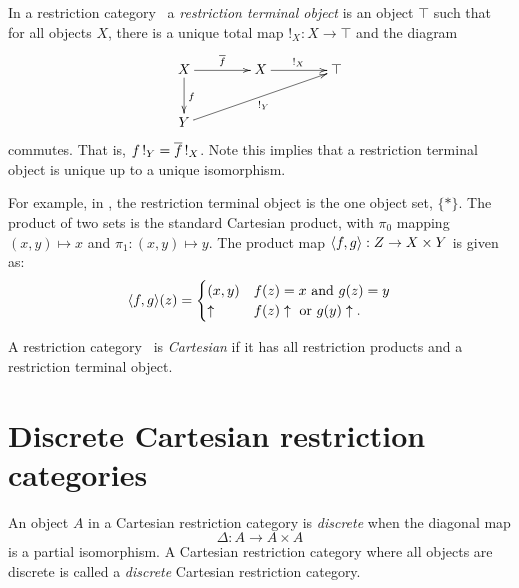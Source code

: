 \begin{definition}\label{def:restriction_terminal_object}
  In a restriction category \X\, a \emph{restriction terminal object}
  is an object $\top$ such that for all objects $X$, there is a
  unique total map $!_X : X \to \top$ and the diagram
  \[
    \xymatrix @C=40pt @R=25pt{
      X \ar[r]^{\restr{f}} \ar[d]^{f} & X \ar[r]^{!_X}  &\top  \\
      Y \ar[urr]_{!_Y}
    }
  \]
  commutes. That is,  $f\, !_Y = \overline{f}\, !_X$. Note this implies
  that a restriction terminal object is unique up to a unique isomorphism.
\end{definition}

For example, in \Par, the restriction terminal object is the one object set, $\{*\}$. The product of
two sets is the standard Cartesian product, with $\pi_0$ mapping $(x,y) \mapsto x$ and
$\pi_1:(x,y)\mapsto y$. The product map $\langle f,g\rangle:Z\to X\times Y$ is given as:
\[
  \langle f,g\rangle(z) = \begin{cases}
    (x,y)&f(z) = x\text{ and } g(z) = y\\
    \uparrow&f(z) \uparrow\text{ or }g(y)\uparrow.
    \end{cases}
\]

\begin{definition}\label{def:cartesian_restriction_category}
  A restriction category \X\ is \emph{Cartesian} if it has all restriction products
  and a restriction terminal object.
\end{definition}

\section{Discrete Cartesian restriction categories}\label{sub:discrete_restriction_categories}

\begin{definition}\label{def:discrete_object_and_discrete_cartesian}
  An object $A$ in a Cartesian restriction category is \emph{discrete}
  when the diagonal map
  \[
    \Delta:A \to A \times A
  \]
  is a partial isomorphism.
  A  Cartesian restriction category where all objects are
  discrete is called a \emph{discrete} Cartesian restriction category.
\end{definition}


